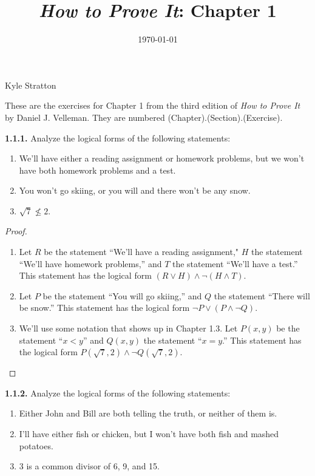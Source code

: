 \documentclass[12pt]{amsart}
\title{\emph{How to Prove It}: Chapter 1} %
\date{\today}
\newenvironment{statement}[1]{\smallskip\noindent\color[rgb]{.6627, .3529, .6314} {\bf #1.}}{}
\theoremstyle{definition}
\theoremstyle{remark}
\begin{document}
\maketitle

\vspace*{-0.25in}
\centerline{Kyle Stratton}

\begin{framed}
These are the exercises for Chapter 1 from the third edition of \emph{How to Prove It} by Daniel J. Velleman.
They are numbered (Chapter).(Section).(Exercise).
\end{framed}

\begin{statement}{1.1.1}
Analyze the logical forms of the following statements:
\begin{enumerate}
	\item We'll have either a reading assignment or homework problems, but we won't have both homework problems and a test.
	\item You won't go skiing, or you will and there won't be any snow.
	\item $\sqrt{7} \nleq 2$.
\end{enumerate}
\end{statement}

\begin{proof}
\hfill
\begin{enumerate}
	\item Let $R$ be the statement ``We'll have a reading assignment," $H$ the statement ``We'll have homework problems,'' and $T$ the statement ``We'll have a test.''
	This statement has the logical form $(R \vee H) \wedge \neg (H \wedge T)$.
	
	\item Let $P$ be the statement ``You will go skiing,'' and $Q$ the statement ``There will be snow.''
	This statement has the logical form $\neg P \vee (P \wedge \neg Q)$.
	
	\item We'll use some notation that shows up in Chapter 1.3.
	Let $P(x, y)$ be the statement ``$x < y$'' and $Q(x, y)$ the statement ``$x = y$.''
	This statement has the logical form $P(\sqrt{7}, 2) \wedge \neg Q(\sqrt{7}, 2)$.
\end{enumerate}
\end{proof}


\begin{statement}{1.1.2}
Analyze the logical forms of the following statements:
\begin{enumerate}
	\item Either John and Bill are both telling the truth, or neither of them is.
	\item I'll have either fish or chicken, but I won't have both fish and mashed potatoes.
	\item 3 is a common divisor of 6, 9, and 15.
\end{enumerate}
\end{statement}
\end{document}
